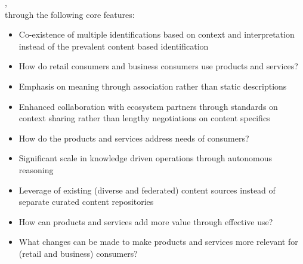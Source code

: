 ,\\
through the following core features:

\begin{description}[font=\bfseries,nosep,leftmargin=!,labelwidth=\widthof{\bfseries UNDERSTAND}]
    \item[SENSE]
        \begin{itemize}[leftmargin=1em]
            \item Co-existence of multiple identifications based on context and interpretation instead of
                  the prevalent content based identification
            \item How do retail consumers and business consumers use products and services?
        \end{itemize}
    \item[UNDERSTAND]
        \begin{itemize}[leftmargin=1em]
            \item Emphasis on meaning through association rather than static descriptions
            \item Enhanced collaboration with ecosystem partners through standards on context sharing
                  rather than lengthy negotiations on content specifics
            \item How do the products and services address needs of consumers?
        \end{itemize}
    \item[DECIDE]
        \begin{itemize}[leftmargin=1em]
            \item Significant scale in knowledge driven operations through autonomous reasoning
            \item Leverage of existing (diverse and federated) content sources instead of
                  separate curated content repositories
            \item How can products and services add more value through effective use?
            \item What changes can be made to make products and services more relevant
                  for (retail and business) consumers?
        \end{itemize}
\end{description}

\label{sec:ekg-mm-business-identity}

